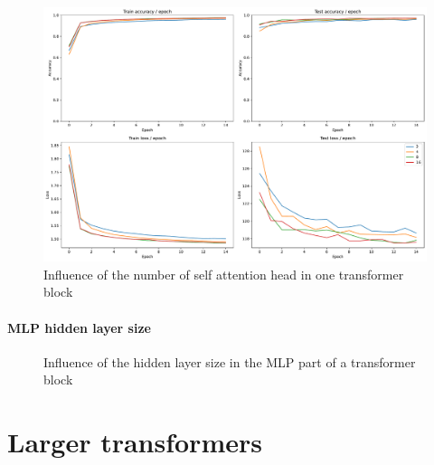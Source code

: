 \begin{figure}[H]
    \centering
    \includegraphics*[width=\textwidth]{figs/Transformers/num_heads_influence.pdf}
    \caption{Influence of the number of self attention head in one transformer block }
    \label{fig:num_heads_influence}
\end{figure}

\paragraph{MLP hidden layer size}

\begin{figure}[H]
    \centering
    \caption{Influence of the hidden layer size in the MLP part of a transformer block}
    \label{fig:mlp_ratio_influence}
\end{figure}


\section{Larger transformers}